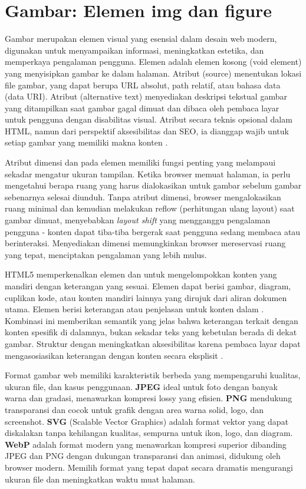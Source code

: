 ﻿\section{Gambar: Elemen img dan figure}

Gambar merupakan elemen visual yang esensial dalam desain web modern, digunakan untuk menyampaikan informasi, meningkatkan estetika, dan memperkaya pengalaman pengguna. Elemen  adalah elemen kosong (void element) yang menyisipkan gambar ke dalam halaman. Atribut  (source) menentukan lokasi file gambar, yang dapat berupa URL absolut, path relatif, atau bahasa data (data URI). Atribut  (alternative text) menyediakan deskripsi tekstual gambar yang ditampilkan saat gambar gagal dimuat dan dibaca oleh pembaca layar untuk pengguna dengan disabilitas visual. Atribut  secara teknis opsional dalam HTML, namun dari perspektif aksesibilitas dan SEO, ia dianggap wajib untuk setiap gambar yang memiliki makna konten \cite{mdnAccessibility}.

Atribut dimensi  dan  pada elemen  memiliki fungsi penting yang melampaui sekadar mengatur ukuran tampilan. Ketika browser memuat halaman, ia perlu mengetahui berapa ruang yang harus dialokasikan untuk gambar sebelum gambar sebenarnya selesai diunduh. Tanpa atribut dimensi, browser mengalokasikan ruang minimal dan kemudian melakukan reflow (perhitungan ulang layout) saat gambar dimuat, menyebabkan \textit{layout shift} yang mengganggu pengalaman pengguna - konten dapat tiba-tiba bergerak saat pengguna sedang membaca atau berinteraksi. Menyediakan dimensi memungkinkan browser mereservasi ruang yang tepat, menciptakan pengalaman yang lebih mulus.

HTML5 memperkenalkan elemen  dan  untuk mengelompokkan konten yang mandiri dengan keterangan yang sesuai. Elemen  dapat berisi gambar, diagram, cuplikan kode, atau konten mandiri lainnya yang dirujuk dari aliran dokumen utama. Elemen  berisi keterangan atau penjelasan untuk konten dalam . Kombinasi ini memberikan semantik yang jelas bahwa keterangan terkait dengan konten spesifik di dalamnya, bukan sekadar teks yang kebetulan berada di dekat gambar. Struktur  dengan  meningkatkan aksesibilitas karena pembaca layar dapat mengasosiasikan keterangan dengan konten secara eksplisit \cite{webdevAccessibility}.

Format gambar web memiliki karakteristik berbeda yang mempengaruhi kualitas, ukuran file, dan kasus penggunaan. \textbf{JPEG} ideal untuk foto dengan banyak warna dan gradasi, menawarkan kompresi lossy yang efisien. \textbf{PNG} mendukung transparansi dan cocok untuk grafik dengan area warna solid, logo, dan screenshot. \textbf{SVG} (Scalable Vector Graphics) adalah format vektor yang dapat diskalakan tanpa kehilangan kualitas, sempurna untuk ikon, logo, dan diagram. \textbf{WebP} adalah format modern yang menawarkan kompresi superior dibanding JPEG dan PNG dengan dukungan transparansi dan animasi, didukung oleh browser modern. Memilih format yang tepat dapat secara dramatis mengurangi ukuran file dan meningkatkan waktu muat halaman.


